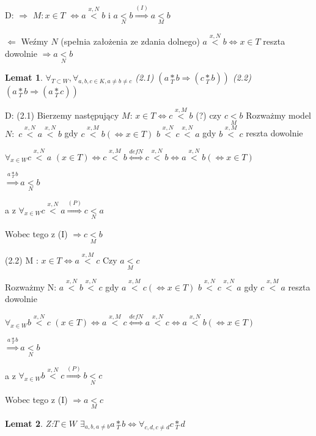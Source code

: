 \documentclass[12pt,a4paper]{article}
\theoremstyle{break}
\newtheorem{lemma}{Lemat}[section]
\newcommand{\witw}{$\Leftrightarrow$}
\begin{document}
		D: $\Rightarrow$ $M: x \in T $ \witw $a\overset{x,N}{<}b$ i $a\underset{N}{<}b \overset{(I)}{\Rightarrow} a\underset{M}{<}b$
		
		$\Leftarrow$ Weźmy $N$ (spełnia założenia ze zdania dolnego) $a\overset{x,N}{<}b \Leftrightarrow x\in T$ reszta dowolnie $\Rightarrow a\underset{N}{<}b$ 
	
	
	\begin{lemma}
		$\forall_{T\subset W}, \forall_{a,b,c \in K, a\neq b\neq c} $
		(2.1) $(a\underset{T}{*}b \Rightarrow (c\underset{T}{*}b))$
		(2.2) $(a\underset{T}{*}b \Rightarrow (a\underset{T}{*}c))$
	\end{lemma}
	D: (2.1) Bierzemy następujący $M$: $x\in T \Leftrightarrow c\overset{x,M}{<}b$ (?) czy $c\underset{M}{<}b$
	Rozważmy model $N:$ $c\overset{x,N}{<}a\overset{x,N}{<}b$ gdy $c\overset{x,M}{<}b (\Leftrightarrow x\in T)$ 
	$b\overset{x,N}{<}c\overset{x,N}{<}a$ gdy $b\overset{x,M}{<}c$ reszta dowolnie
	
	$\forall_{x\in W} c\overset{x,N}{<}a$ $(x\in T) \Leftrightarrow c\overset{x,M}{<}b \overset{def N}{\Leftrightarrow} c\overset{x,N}{<}b \Leftrightarrow a\overset{x,N}{<}b (\Leftrightarrow x\in T)$
	
	$\overset{a\underset{T}{*}b}{\Rightarrow} a\underset{N}{<}b$
	
	a z $\forall_{x\in W} c\overset{x,N}{<}a \overset{(P)}{\Rightarrow} c\underset{N}{<}a$
	
	Wobec tego z (I) $\Rightarrow c\underset{M}{<}b$
	
	(2.2) M : $x\in T \Leftrightarrow a\overset{x,M}{<}c$ Czy $a\underset{M}{<}c$
	
	Rozważmy N: $a\overset{x,N}{<}b\overset{x,N}{<}c$ gdy $a\overset{x,M}{<}c (\Leftrightarrow x\in T)$ 
	$b\overset{x,N}{<}c\overset{x,N}{<}a$ gdy $c\overset{x,M}{<}a$ reszta dowolnie
	
	$\forall_{x\in W} b\overset{x,N}{<}c$ $(x\in T) \Leftrightarrow a\overset{x,M}{<}c \overset{def N}{\Leftrightarrow} a\overset{x,N}{<}c \Leftrightarrow a\overset{x,N}{<}b (\Leftrightarrow x\in T)$
	
	$\overset{a\underset{T}{*}b}{\Rightarrow} a\underset{N}{<}b$
	
	a z $\forall_{x\in W} b\overset{x,N}{<}c \overset{(P)}{\Rightarrow} b\underset{N}{<}c$
	
	Wobec tego z (I) $\Rightarrow a\underset{M}{<}c$
	
	\begin{lemma}
		Z:$T\in W$
		$\exists_{a,b ,a\neq b} a\underset{T}{*}b \Leftrightarrow \forall_{c,d, c\neq d} c\underset{T}{*}d$
	\end{lemma}
	
\end{document}
